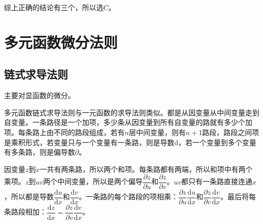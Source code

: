 \documentclass[UTF8, 12pt]{ctexart}
\begin{document}
综上正确的结论有三个，所以选$C$。

\section{多元函数微分法则}

\subsection{链式求导法则}

主要对显函数的微分。

多元函数链式求导法则与一元函数的求导法则类似。都是从因变量从中间变量走到自变量。一条路径是一个加项，多少条从因变量到所有自变量的路就有多少个加项。每条路上由不同的路段组成，若有$n$层中间变量，则有$n+1$路段，路段之间项是乘积形式，若变量只与一个变量有一条路，则是导数$\textrm{d}$，若一个变量到多个变量有多条路，则是偏导数$\partial$。

\begin{minipage}{0.65\linewidth}
    因变量$z$到$x$一共有两条路，所以两个和项。每条路都有两端，所以和项中有两个乘项。$z$到$uv$两个中间变量，所以是两个偏导$\dfrac{\partial z}{\partial u}$和$\dfrac{\partial z}{\partial v}$。$uv$都只有一条路直接连通$x$，所以都是导数$\dfrac{\textrm{d}u}{\textrm{d}x}$和$\dfrac{\textrm{d}v}{\textrm{d}x}$。一条路的每个路段的项相乘：$\dfrac{\partial z}{\partial u}\dfrac{\textrm{d}u}{\textrm{d}x}$和$\dfrac{\partial z}{\partial v}\dfrac{\textrm{d}v}{\textrm{d}x}$。最后将每条路段相加：$\dfrac{\textrm{d}z}{\textrm{d}x}=\dfrac{\partial z}{\partial v}\dfrac{\textrm{d}v}{\textrm{d}x}$。
\end{minipage}
\hfill
\begin{minipage}{0.25\linewidth}
\end{minipage} \medskip
\end{document}
